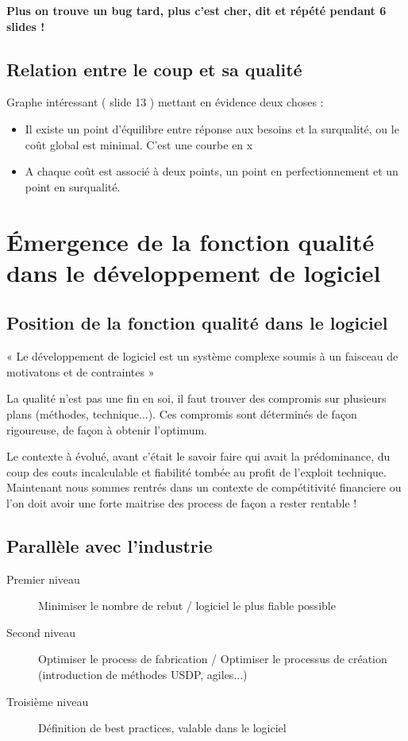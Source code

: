 \textbf{Plus on trouve un bug  tard, plus c’est cher, dit et répété pendant 6 slides !}

	\subsection{Relation entre le coup et sa qualité}

	Graphe intéressant ( slide 13 ) mettant en évidence deux choses :

	\begin{itemize}
    \item Il existe un point d'équilibre entre réponse aux besoins et la surqualité, ou le coût global est minimal. C’est une courbe en x
    \item A chaque coût est associé à deux points, un point en perfectionnement et un point en surqualité.
	\end{itemize}



\section{Émergence de la fonction qualité dans le développement de logiciel}

	\subsection{Position de la fonction qualité dans le logiciel}

    « Le développement de logiciel est un système complexe soumis à un faisceau de motivatons et de contraintes »

La qualité n’est pas une fin en soi, il faut trouver des compromis sur plusieurs plans (méthodes, technique...). Ces compromis sont déterminés de façon rigoureuse, de façon à obtenir l’optimum.

Le contexte à évolué, avant c’était le savoir faire qui avait la prédominance, du coup des couts incalculable et fiabilité tombée au profit de l’exploit technique. Maintenant nous sommes rentrés dans un contexte de compétitivité financiere ou l’on doit avoir une forte maitrise des process de façon a rester rentable !

	\subsection{Parallèle avec l’industrie}
	
	\begin{description}
	\item[Premier niveau] Minimiser le nombre de rebut  / logiciel le plus fiable possible
	\item[Second niveau] Optimiser le process de fabrication  / Optimiser le processus de création (introduction de méthodes USDP, agiles...)
	\item[Troisième niveau]Définition de best practices, valable dans le logiciel
	\end{description}


